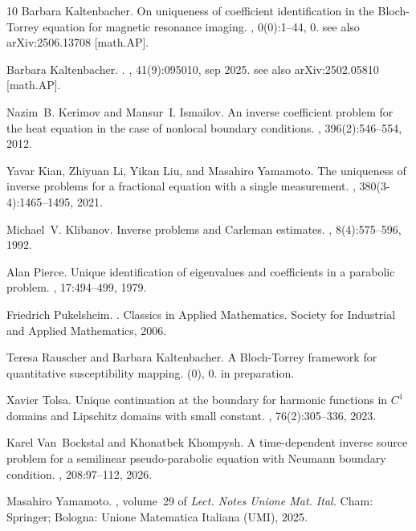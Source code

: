\documentclass[12pt]{article}
\begin{document}
\begin{thebibliography}{10}
Barbara Kaltenbacher.
\newblock On uniqueness of coefficient identification in the {Bloch-Torrey}
  equation for magnetic resonance imaging.
,
  0(0):1--44, 0.
\newblock see also arXiv:2506.13708 [math.AP].

Barbara Kaltenbacher.
.
, 41(9):095010, sep 2025.
\newblock see also arXiv:2502.05810 [math.AP].

Nazim~B. Kerimov and Mansur~I. Ismailov.
\newblock An inverse coefficient problem for the heat equation in the case of
  nonlocal boundary conditions.
, 396(2):546--554, 2012.

Yavar Kian, Zhiyuan Li, Yikan Liu, and Masahiro Yamamoto.
\newblock The uniqueness of inverse problems for a fractional equation with a
  single measurement.
, 380(3-4):1465--1495, 2021.

Michael~V. Klibanov.
\newblock Inverse problems and {Carleman} estimates.
, 8(4):575--596, 1992.

Alan Pierce.
\newblock Unique identification of eigenvalues and coefficients in a parabolic
  problem.
, 17:494--499, 1979.

Friedrich Pukelsheim.
.
\newblock Classics in Applied Mathematics. Society for Industrial and Applied
  Mathematics, 2006.

Teresa Rauscher and Barbara Kaltenbacher.
\newblock A {Bloch-Torrey} framework for quantitative susceptibility mapping.
(0), 0.
\newblock in preparation.

Xavier Tolsa.
\newblock Unique continuation at the boundary for harmonic functions in
  {{\(C^1\)}} domains and {Lipschitz} domains with small constant.
, 76(2):305--336, 2023.

Karel Van~Bockstal and Khonatbek Khompysh.
\newblock A time-dependent inverse source problem for a semilinear
  pseudo-parabolic equation with {Neumann} boundary condition.
, 208:97--112, 2026.

Masahiro Yamamoto.
, volume~29 of {\em Lect.
  Notes Unione Mat. Ital.}
\newblock Cham: Springer; Bologna: Unione Matematica Italiana (UMI), 2025.

\end{thebibliography}
\end{document}
